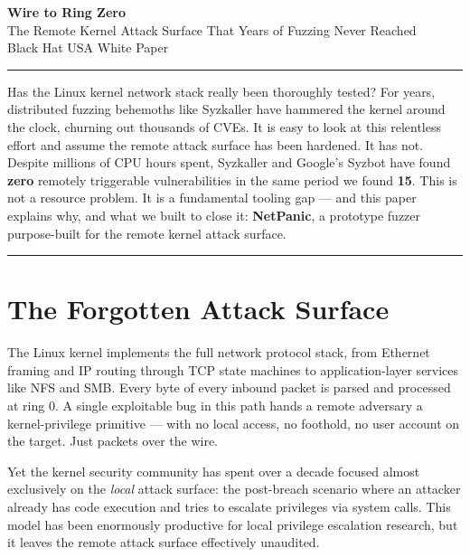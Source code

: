 \documentclass[10pt]{article}
\begin{document}
\begin{center}
  {\LARGE\bfseries Wire to Ring Zero}\\[0.2em]
  {\large The Remote Kernel Attack Surface That Years of Fuzzing Never Reached}\\[0.5em]
  {\small Black Hat USA White Paper}
\end{center}

\vspace{0.5em}
\noindent\rule{\linewidth}{0.8pt}
\vspace{0.3em}

\noindent
Has the Linux kernel network stack really been thoroughly tested? For years, distributed fuzzing behemoths like Syzkaller have hammered the kernel around the clock, churning out thousands of CVEs. It is easy to look at this relentless effort and assume the remote attack surface has been hardened. It has not. Despite millions of CPU hours spent, Syzkaller and Google's Syzbot have found \textbf{zero} remotely triggerable vulnerabilities in the same period we found \textbf{15}. This is not a resource problem. It is a fundamental tooling gap --- and this paper explains why, and what we built to close it: \textbf{NetPanic}, a prototype fuzzer purpose-built for the remote kernel attack surface.

\vspace{0.3em}
\noindent\rule{\linewidth}{0.4pt}
\vspace{0.3em}

\section{The Forgotten Attack Surface}

The Linux kernel implements the full network protocol stack, from Ethernet framing and IP routing through TCP state machines to application-layer services like NFS and SMB. Every byte of every inbound packet is parsed and processed at ring 0. A single exploitable bug in this path hands a remote adversary a kernel-privilege primitive --- with no local access, no foothold, no user account on the target. Just packets over the wire.

Yet the kernel security community has spent over a decade focused almost exclusively on the \emph{local} attack surface: the post-breach scenario where an attacker already has code execution and tries to escalate privileges via system calls. This model has been enormously productive for local privilege escalation research, but it leaves the remote attack surface effectively unaudited.
\end{document}
